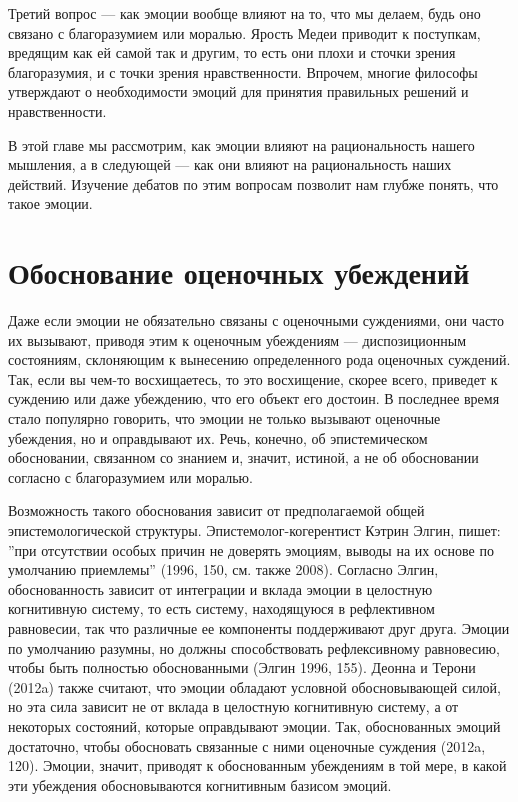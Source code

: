 \documentclass[11pt]{book}
\begin{document}
Третий вопрос --- как эмоции вообще влияют на то, что мы делаем, будь оно связано с благоразумием или моралью. Ярость Медеи приводит к поступкам, вредящим как ей самой так и другим, то есть они плохи и сточки зрения благоразумия, и с точки зрения нравственности. Впрочем, многие философы утверждают о необходимости эмоций для принятия правильных решений и нравственности.

В этой главе мы рассмотрим, как эмоции влияют на рациональность нашего мышления, а в следующей --- как они влияют на рациональность наших действий. Изучение дебатов по этим вопросам позволит нам глубже понять, что такое эмоции.

\section{Обоснование оценочных убеждений}

Даже если эмоции не обязательно связаны с оценочными суждениями, они часто их вызывают, приводя этим к оценочным убеждениям --- диспозиционным состояниям, склоняющим к вынесению определенного рода оценочных суждений. Так, если вы чем-то восхищаетесь, то это восхищение, скорее всего, приведет к суждению или даже убеждению, что его объект его достоин. В последнее время стало популярно говорить, что эмоции не только вызывают оценочные убеждения, но и оправдывают их. Речь, конечно, об эпистемическом обосновании, связанном со знанием и, значит, истиной, а не об обосновании согласно с благоразумием или моралью.

Возможность такого обоснования зависит от предполагаемой общей эпистемологической структуры. Эпистемолог-когерентист Кэтрин Элгин, пишет: ''при отсутствии особых причин не доверять эмоциям, выводы на их основе по умолчанию приемлемы'' (1996, 150, см. также 2008). Согласно Элгин, обоснованность зависит от интеграции и вклада эмоции в целостную когнитивную систему, то есть систему, находящуюся в рефлективном равновесии, так что различные ее компоненты поддерживают друг друга. Эмоции по умолчанию разумны, но должны способствовать рефлексивному равновесию, чтобы быть полностью обоснованными (Элгин 1996, 155). Деонна и Терони (2012a) также считают, что эмоции обладают условной обосновывающей силой, но эта сила зависит не от вклада в целостную когнитивную систему, а от некоторых состояний, которые оправдывают эмоции. Так, обоснованных эмоций достаточно, чтобы обосновать связанные с ними оценочные суждения (2012a, 120). Эмоции, значит, приводят к обоснованным убеждениям в той мере, в какой эти убеждения обосновываются когнитивным базисом эмоций.
\end{document}
